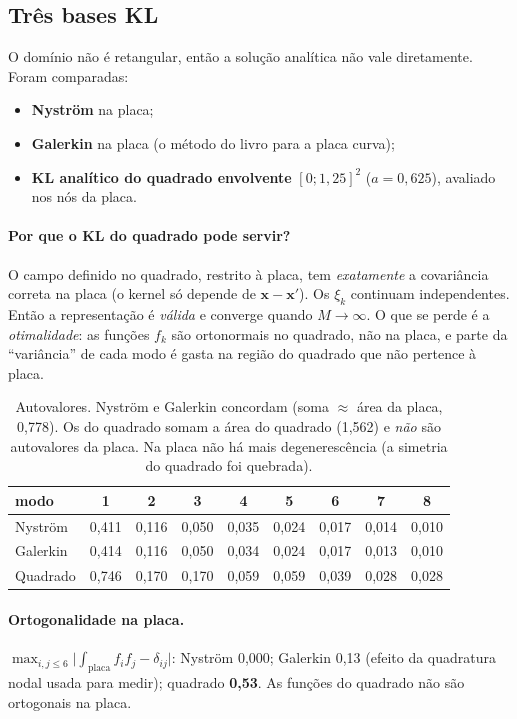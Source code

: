 \documentclass[11pt,a4paper]{article}
\newcommand{\bx}{\bm{x}}
\begin{document}
\subsection{Três bases KL}
O domínio não é retangular, então a solução analítica não vale diretamente. Foram comparadas:
\begin{itemize}
  \item \textbf{Nyström} na placa;
  \item \textbf{Galerkin} na placa (o método do livro para a placa curva);
  \item \textbf{KL analítico do quadrado envolvente} $[0;1{,}25]^2$ ($a=0{,}625$), avaliado nos nós da placa.
\end{itemize}

\paragraph{Por que o KL do quadrado pode servir?} O campo definido no quadrado, restrito à placa, tem \emph{exatamente} a covariância correta na placa (o kernel só depende de $\bx-\bx'$). Os $\xi_k$ continuam independentes. Então a representação é \emph{válida} e converge quando $M\to\infty$. O que se perde é a \emph{otimalidade}: as funções $f_k$ são ortonormais no quadrado, não na placa, e parte da ``variância'' de cada modo é gasta na região do quadrado que não pertence à placa.

\begin{table}[H]
\centering
\begin{tabular}{lcccccccc}
\toprule
modo & 1 & 2 & 3 & 4 & 5 & 6 & 7 & 8\\
\midrule
Nyström   & 0,411 & 0,116 & 0,050 & 0,035 & 0,024 & 0,017 & 0,014 & 0,010\\
Galerkin  & 0,414 & 0,116 & 0,050 & 0,034 & 0,024 & 0,017 & 0,013 & 0,010\\
Quadrado  & 0,746 & 0,170 & 0,170 & 0,059 & 0,059 & 0,039 & 0,028 & 0,028\\
\bottomrule
\end{tabular}
\caption{Autovalores. Nyström e Galerkin concordam (soma $\approx$ área da placa, 0,778). Os do quadrado somam a área do quadrado (1,562) e \emph{não} são autovalores da placa. Na placa não há mais degenerescência (a simetria do quadrado foi quebrada).}
\end{table}

\paragraph{Ortogonalidade na placa.} $\max_{i,j\le6}\big|\int_{\text{placa}}f_if_j-\delta_{ij}\big|$: Nyström 0,000; Galerkin 0,13 (efeito da quadratura nodal usada para medir); quadrado \textbf{0,53}. As funções do quadrado não são ortogonais na placa.
\end{document}
